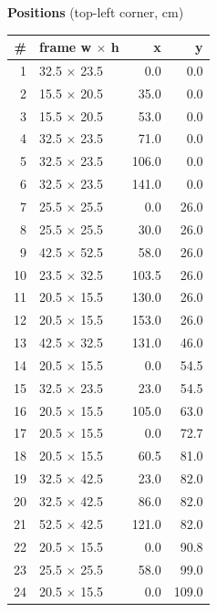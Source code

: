 \documentclass[a4paper,landscape,10pt]{article}
\begin{document}
\begin{minipage}[t]{0.25\textwidth}
\vspace{8pt}
{\bfseries Positions} (top-left corner, cm)\\[2pt]
\tiny
\begin{tabular}{@{}r l r r@{}}
\toprule
\# & frame w $\times$ h & x & y \\
\midrule
1 & 32.5 $\times$ 23.5 & 0.0 & 0.0 \\
2 & 15.5 $\times$ 20.5 & 35.0 & 0.0 \\
3 & 15.5 $\times$ 20.5 & 53.0 & 0.0 \\
4 & 32.5 $\times$ 23.5 & 71.0 & 0.0 \\
5 & 32.5 $\times$ 23.5 & 106.0 & 0.0 \\
6 & 32.5 $\times$ 23.5 & 141.0 & 0.0 \\
7 & 25.5 $\times$ 25.5 & 0.0 & 26.0 \\
8 & 25.5 $\times$ 25.5 & 30.0 & 26.0 \\
9 & 42.5 $\times$ 52.5 & 58.0 & 26.0 \\
10 & 23.5 $\times$ 32.5 & 103.5 & 26.0 \\
11 & 20.5 $\times$ 15.5 & 130.0 & 26.0 \\
12 & 20.5 $\times$ 15.5 & 153.0 & 26.0 \\
13 & 42.5 $\times$ 32.5 & 131.0 & 46.0 \\
14 & 20.5 $\times$ 15.5 & 0.0 & 54.5 \\
15 & 32.5 $\times$ 23.5 & 23.0 & 54.5 \\
16 & 20.5 $\times$ 15.5 & 105.0 & 63.0 \\
17 & 20.5 $\times$ 15.5 & 0.0 & 72.7 \\
18 & 20.5 $\times$ 15.5 & 60.5 & 81.0 \\
19 & 32.5 $\times$ 42.5 & 23.0 & 82.0 \\
20 & 32.5 $\times$ 42.5 & 86.0 & 82.0 \\
21 & 52.5 $\times$ 42.5 & 121.0 & 82.0 \\
22 & 20.5 $\times$ 15.5 & 0.0 & 90.8 \\
23 & 25.5 $\times$ 25.5 & 58.0 & 99.0 \\
24 & 20.5 $\times$ 15.5 & 0.0 & 109.0 \\
\bottomrule
\end{tabular}
\end{minipage}
\clearpage
\end{document}
